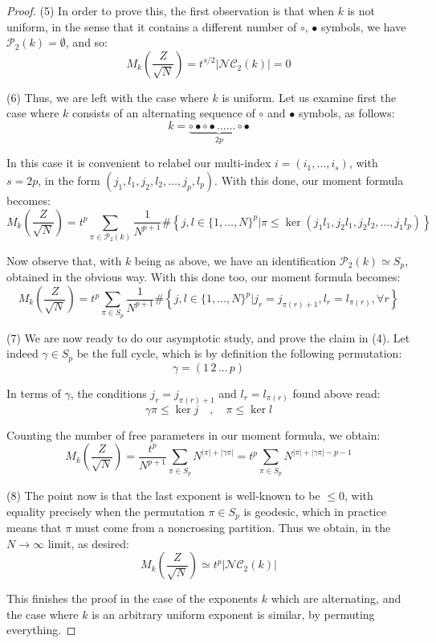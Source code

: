 \documentclass[12pt]{amsbook}
\begin{document}
\begin{proof}
(5) In order to prove this, the first observation is that when $k$ is not uniform, in the sense that it contains a different number of $\circ$, $\bullet$ symbols, we have $\mathcal P_2(k)=\emptyset$, and so:
$$M_k\left(\frac{Z}{\sqrt{N}}\right)=t^{s/2}|\mathcal{NC}_2(k)|=0$$

(6) Thus, we are left with the case where $k$ is uniform. Let us examine first the case where $k$ consists of an alternating sequence of $\circ$ and $\bullet$ symbols, as follows:
$$k=\underbrace{\circ\bullet\circ\bullet\ldots\ldots\circ\bullet}_{2p}$$

In this case it is convenient to relabel our multi-index $i=(i_1,\ldots,i_s)$, with $s=2p$, in the form $(j_1,l_1,j_2,l_2,\ldots,j_p,l_p)$. With this done, our moment formula becomes:
$$M_k\left(\frac{Z}{\sqrt{N}}\right)
=t^p\sum_{\pi\in\mathcal P_2(k)}\frac{1}{N^{p+1}}\#\left\{j,l\in\{1,\ldots,N\}^p\Big|\pi\leq\ker\left(j_1l_1,j_2l_1,j_2l_2,\ldots,j_1l_p\right)\right\}$$

Now observe that, with $k$ being as above, we have an identification $\mathcal P_2(k)\simeq S_p$, obtained in the obvious way. With this done too, our moment formula becomes:
$$M_k\left(\frac{Z}{\sqrt{N}}\right)
=t^p\sum_{\pi\in S_p}\frac{1}{N^{p+1}}\#\left\{j,l\in\{1,\ldots,N\}^p\Big|j_r=j_{\pi(r)+1},l_r=l_{\pi(r)},\forall r\right\}$$

(7) We are now ready to do our asymptotic study, and prove the claim in (4). Let indeed $\gamma\in S_p$ be the full cycle, which is by definition the following permutation:
$$\gamma=(1 \, 2 \, \ldots \, p)$$

In terms of $\gamma$, the conditions $j_r=j_{\pi(r)+1}$ and $l_r=l_{\pi(r)}$ found above read:
$$\gamma\pi\leq\ker j\quad,\quad 
\pi\leq\ker l$$

Counting the number of free parameters in our moment formula, we obtain:
$$M_k\left(\frac{Z}{\sqrt{N}}\right)
=\frac{t^p}{N^{p+1}}\sum_{\pi\in S_p}N^{|\pi|+|\gamma\pi|}
=t^p\sum_{\pi\in S_p}N^{|\pi|+|\gamma\pi|-p-1}$$

(8) The point now is that the last exponent is well-known to be $\leq 0$, with equality precisely when the permutation $\pi\in S_p$ is geodesic, which in practice means that $\pi$ must come from a noncrossing partition. Thus we obtain, in the $N\to\infty$ limit, as desired:
$$M_k\left(\frac{Z}{\sqrt{N}}\right)\simeq t^p|\mathcal{NC}_2(k)|$$

This finishes the proof in the case of the exponents $k$ which are alternating, and the case where $k$ is an arbitrary uniform exponent is similar, by permuting everything.
\end{proof}
\end{document}
